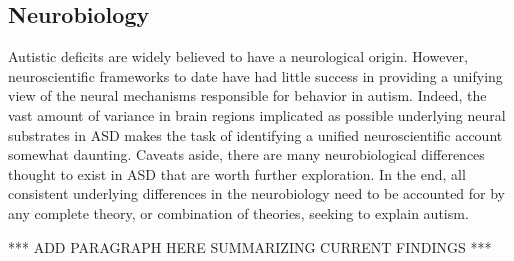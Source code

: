 \documentclass[man]{apa}
\begin{document}
\subsection{Neurobiology}

Autistic deficits are widely believed to have a neurological origin.  However, neuroscientific frameworks to date have had little success in providing a unifying view of the neural mechanisms responsible for behavior in autism.   Indeed, the vast amount of variance in brain regions implicated as possible underlying neural substrates in ASD makes the task of identifying a unified neuroscientific account somewhat daunting. Caveats aside, there are many neurobiological differences thought to exist in ASD that are worth further exploration. In the end, all consistent underlying differences in the neurobiology need to be accounted for by any complete theory, or combination of theories, seeking to explain autism.

*** ADD PARAGRAPH HERE SUMMARIZING CURRENT FINDINGS *** 
\end{document}
